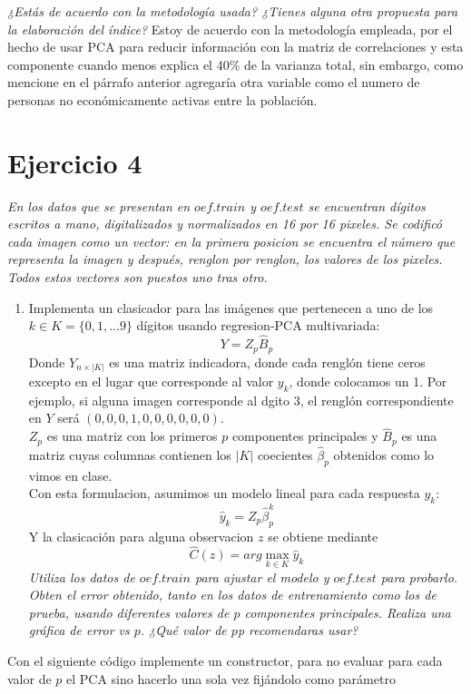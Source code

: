 \documentclass[paper=letter, fontsize=11pt]{scrartcl}
\numberwithin{equation}{section} %
\numberwithin{figure}{section} %
\numberwithin{table}{section} %
\begin{document}
\begin{enumerate}
\textit{ ¿Estás de acuerdo con la metodología usada? ¿Tienes alguna otra propuesta para la elaboración del índice?}
Estoy de acuerdo con la metodología empleada, por el hecho de usar PCA para reducir información con la matriz de correlaciones y esta componente cuando menos explica el 40\% de la varianza total, sin embargo, como mencione en el párrafo anterior agregaría otra variable como el numero de personas no económicamente activas entre la población.

\section{Ejercicio 4}
\textit{En los datos que se presentan en $oef.train$ y $oef.test$ se encuentran dígitos escritos a mano, digitalizados y normalizados en 16 por 16 pixeles. Se codificó cada imagen como un vector: en la primera posicion se encuentra el número que representa la imagen y después, renglon por renglon, los valores de los pixeles. Todos estos vectores son puestos uno tras otro.}
\begin{enumerate}
\item Implementa un clasicador para las imágenes que pertenecen a uno de los $k \in K = \{0, 1, \dots 9\}$ dígitos usando regresion-PCA multivariada:
\[Y = Z_p\hat{B}_p\]
Donde $Y_{n\times|K|}$ es una matriz indicadora, donde cada renglón tiene ceros excepto en el lugar que corresponde al valor $y_k$, donde colocamos un 1. Por ejemplo, si alguna imagen corresponde al dgito $3$, el renglón correspondiente en $Y$ será $(0, 0, 0, 1, 0, 0, 0, 0, 0, 0).$\\
$Z_p$ es una matriz con los primeros $p$ componentes principales y $\hat{B}_p$ es una matriz cuyas columnas contienen los $|K|$ coecientes $\hat{\beta}_p$ obtenidos como lo vimos en clase.\\
Con esta formulacion, asumimos un modelo lineal para cada respuesta $y_k$:
\[
\hat{y}_k=Z_p\hat{\beta}_p^k
\]
Y la clasicación para alguna observacion $z$ se obtiene mediante
\[
\hat{C}(z) = arg \max_{k\in K} \hat{y}_k
\]\textit{
Utiliza los datos de $oef.train$ para ajustar el modelo y $oef.test$ para probarlo.\\
Obten el error obtenido, tanto en los datos de entrenamiento como los de prueba,
usando diferentes valores de $p$ componentes principales. Realiza una gráfica de
error vs $p$. ¿Qué valor de $p$p recomendaras usar?}
\end{enumerate}
Con el siguiente código implemente un constructor, para no evaluar para cada valor de $p$ el PCA sino hacerlo una sola vez fijándolo como parámetro

\end{enumerate}
\end{document}
